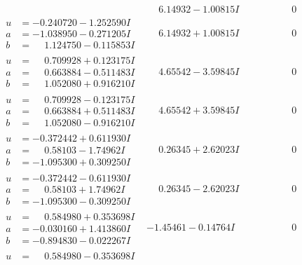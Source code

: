 \documentclass[1p]{elsarticle_modified}
\theoremstyle{definition}
\begin{document}
$$\begin{array}{c|c|c}
 & \phantom{-}6.14932 - 1.00815 I & \phantom{-0.000000 } 0 \\ \hline\begin{aligned}
u &= -0.240720 - 1.252590 I \\
a &= -1.038950 - 0.271205 I \\
b &= \phantom{-}1.124750 - 0.115853 I\end{aligned}
 & \phantom{-}6.14932 + 1.00815 I & \phantom{-0.000000 } 0 \\ \hline\begin{aligned}
u &= \phantom{-}0.709928 + 0.123175 I \\
a &= \phantom{-}0.663884 - 0.511483 I \\
b &= \phantom{-}1.052080 + 0.916210 I\end{aligned}
 & \phantom{-}4.65542 - 3.59845 I & \phantom{-0.000000 } 0 \\ \hline\begin{aligned}
u &= \phantom{-}0.709928 - 0.123175 I \\
a &= \phantom{-}0.663884 + 0.511483 I \\
b &= \phantom{-}1.052080 - 0.916210 I\end{aligned}
 & \phantom{-}4.65542 + 3.59845 I & \phantom{-0.000000 } 0 \\ \hline\begin{aligned}
u &= -0.372442 + 0.611930 I \\
a &= \phantom{-}0.58103 - 1.74962 I \\
b &= -1.095300 + 0.309250 I\end{aligned}
 & \phantom{-}0.26345 + 2.62023 I & \phantom{-0.000000 } 0 \\ \hline\begin{aligned}
u &= -0.372442 - 0.611930 I \\
a &= \phantom{-}0.58103 + 1.74962 I \\
b &= -1.095300 - 0.309250 I\end{aligned}
 & \phantom{-}0.26345 - 2.62023 I & \phantom{-0.000000 } 0 \\ \hline\begin{aligned}
u &= \phantom{-}0.584980 + 0.353698 I \\
a &= -0.030160 + 1.413860 I \\
b &= -0.894830 - 0.022267 I\end{aligned}
 & -1.45461 - 0.14764 I & \phantom{-0.000000 } 0 \\ \hline\begin{aligned}
u &= \phantom{-}0.584980 - 0.353698 I \\

\end{aligned}
\end{array}$$
\end{document}
